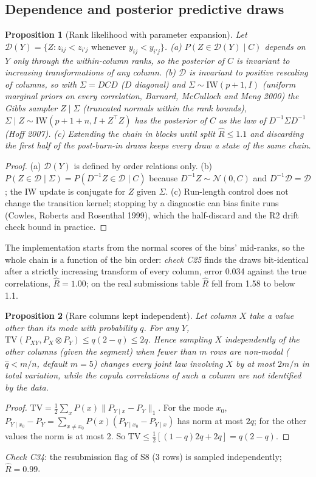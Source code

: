 \documentclass[11pt,a4paper]{article}
\newtheorem{proposition}{Proposition}
\theoremstyle{definition}
\theoremstyle{remark}
\begin{document}
\subsection{Dependence and posterior predictive draws}
\begin{proposition}[Rank likelihood with parameter expansion]\label{prop:rank}
Let $\mathcal D(Y)=\{Z:z_{ij}<z_{i'j}\text{ whenever }y_{ij}<y_{i'j}\}$. (a) $P(Z\in\mathcal D(Y)\mid C)$ depends on $Y$ only through the within-column ranks, so the posterior of $C$ is invariant to increasing transformations of any column. (b) $\mathcal D$ is invariant to positive rescaling of columns, so with $\Sigma=DCD$ ($D$ diagonal) and $\Sigma\sim\mathrm{IW}(p+1,I)$ (uniform marginal priors on every correlation, Barnard, McCulloch and Meng 2000) the Gibbs sampler $Z\mid\Sigma$ (truncated normals within the rank bounds), $\Sigma\mid Z\sim\mathrm{IW}(p+1+n,I+Z^\top Z)$ has the posterior of $C$ as the law of $D^{-1}\Sigma D^{-1}$ (Hoff 2007). (c) Extending the chain in blocks until split $\hat R\le1.1$ and discarding the first half of the post-burn-in draws keeps every draw a state of the same chain.
\end{proposition}
\begin{proof}
(a) $\mathcal D(Y)$ is defined by order relations only. (b) $P(Z\in\mathcal D\mid\Sigma)=P(D^{-1}Z\in\mathcal D\mid C)$ because $D^{-1}Z\sim\mathcal N(0,C)$ and $D^{-1}\mathcal D=\mathcal D$; the IW update is conjugate for $Z$ given $\Sigma$. (c) Run-length control does not change the transition kernel; stopping by a diagnostic can bias finite runs (Cowles, Roberts and Rosenthal 1999), which the half-discard and the R2 drift check bound in practice.
\end{proof}
\noindent The implementation starts from the normal scores of the bins' mid-ranks, so the whole chain is a function of the bin order: \emph{check C25} finds the draws bit-identical after a strictly increasing transform of every column, error 0.034 against the true correlations, $\hat R=1.00$; on the real submissions table $\hat R$ fell from 1.58 to below 1.1.

\begin{proposition}[Rare columns kept independent]\label{prop:rare}
Let column $X$ take a value other than its mode with probability $q$. For any $Y$, $\mathrm{TV}(P_{XY},P_X\otimes P_Y)\le q(2-q)\le2q$. Hence sampling $X$ independently of the other columns (given the segment) when fewer than $m$ rows are non-modal ($\hat q<m/n$, default $m=5$) changes every joint law involving $X$ by at most $2m/n$ in total variation, while the copula correlations of such a column are not identified by the data.
\end{proposition}
\begin{proof}
$\mathrm{TV}=\frac12\sum_xP(x)\|P_{Y\mid x}-P_Y\|_1$. For the mode $x_0$, $P_{Y\mid x_0}-P_Y=\sum_{x\ne x_0}P(x)(P_{Y\mid x_0}-P_{Y\mid x})$ has norm at most $2q$; for the other values the norm is at most 2. So $\mathrm{TV}\le\frac12[(1-q)2q+2q]=q(2-q)$.
\end{proof}
\noindent\emph{Check C34}: the resubmission flag of S8 (3 rows) is sampled independently; $\hat R=0.99$.
\end{document}
